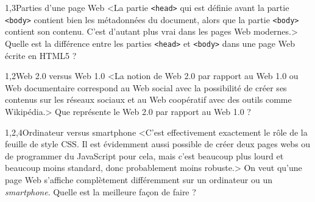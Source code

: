 \begin{quiz}[title={Web et information}]
\vspace{-\baselineskip}
\begin{quizquestion*}[b]{2}{1,3}{Parties d'une page Web}
<La partie \texttt{<head>} qui est définie avant la partie \texttt{<body>} contient bien les métadonnées du document, alors que la partie \texttt{<body>} contient son contenu. C'est d'autant plus vrai dans les pages Web modernes.>
Quelle est la différence entre les parties \texttt{<head>} et \texttt{<body>} dans une page Web écrite en HTML5 ? 
\end{quizquestion*}

\begin{quizquestion*}[b]{3}{1,2}{Web 2.0 {\upshape versus} Web 1.0}
<La notion de Web 2.0 par rapport au Web 1.0 ou Web documentaire correspond au Web social avec la possibilité de créer ses contenus sur les réseaux sociaux et au Web coopératif avec des outils comme Wikipédia.>
Que représente le Web 2.0 par rapport au Web 1.0 ? 
\end{quizquestion*}

\begin{quizquestion*}[b]{3}{1,2,4}{Ordinateur {\upshape versus} {\upshape smartphone}}
<C’est effectivement exactement le rôle de la feuille de style CSS. Il est évidemment aussi possible de créer deux pages webs ou de programmer du JavaScript pour cela, mais c'est beaucoup plus lourd et beaucoup moins standard, donc probablement moins robuste.>
On veut qu’une page Web s’affiche complètement différemment sur un ordinateur ou un \textit{smartphone}. Quelle est la meilleure façon de faire ? 
\end{quizquestion*}


\end{quiz}
